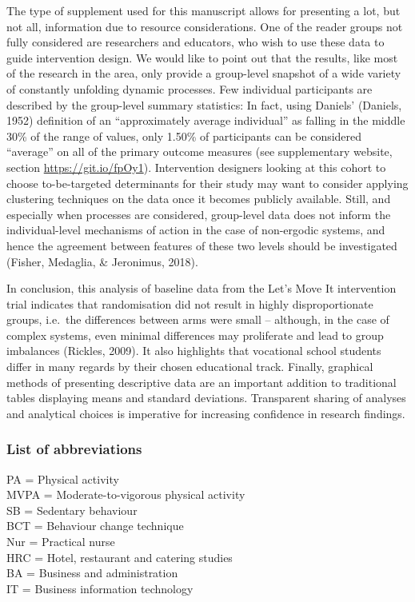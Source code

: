 \documentclass[british,man]{apa6}
\begin{document}
The type of supplement used for this manuscript allows for presenting a lot, but not all, information due to resource considerations. One of the reader groups not fully considered are researchers and educators, who wish to use these data to guide intervention design. We would like to point out that the results, like most of the research in the area, only provide a group-level snapshot of a wide variety of constantly unfolding dynamic processes. Few individual participants are described by the group-level summary statistics: In fact, using Daniels' (Daniels, 1952) definition of an \enquote{approximately average individual} as falling in the middle 30\% of the range of values, only 1.50\% of participants can be considered \enquote{average} on all of the primary outcome measures (see supplementary website, section \url{https://git.io/fpOy1}). Intervention designers looking at this cohort to choose to-be-targeted determinants for their study may want to consider applying clustering techniques on the data once it becomes publicly available. Still, and especially when processes are considered, group-level data does not inform the individual-level mechanisms of action in the case of non-ergodic systems, and hence the agreement between features of these two levels should be investigated (Fisher, Medaglia, \& Jeronimus, 2018).

In conclusion, this analysis of baseline data from the Let's Move It intervention trial indicates that randomisation did not result in highly disproportionate groups, i.e.~the differences between arms were small -- although, in the case of complex systems, even minimal differences may proliferate and lead to group imbalances (Rickles, 2009). It also highlights that vocational school students differ in many regards by their chosen educational track. Finally, graphical methods of presenting descriptive data are an important addition to traditional tables displaying means and standard deviations. Transparent sharing of analyses and analytical choices is imperative for increasing confidence in research findings.

\hypertarget{list-of-abbreviations}{%
\subsubsection{List of abbreviations}\label{list-of-abbreviations}}

\noindent 

PA = Physical activity\\
MVPA = Moderate-to-vigorous physical activity\\
SB = Sedentary behaviour\\
BCT = Behaviour change technique\\
Nur = Practical nurse\\
HRC = Hotel, restaurant and catering studies\\
BA = Business and administration\\
IT = Business information technology
\end{document}
